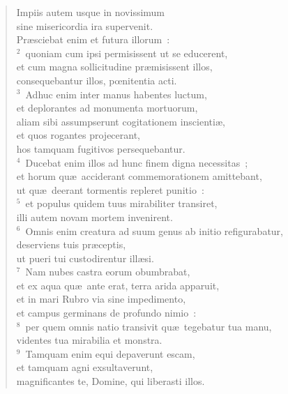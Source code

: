 \begin{flushleft}\begin{verse}\vspace{-19pt}\hspace{6pt}Impiis autem usque in novissimum\\\hspace{6pt} sine misericordia ira supervenit.\\ Pr\ae sciebat enim et futura illorum~:\\
${}^{2}$~quoniam cum ipsi permisissent ut se educerent,\\ et cum magna sollicitudine pr\ae misissent illos,\\ consequebantur illos, pœnitentia acti.\\
${}^{3}$~Adhuc enim inter manus habentes luctum,\\ et deplorantes ad monumenta mortuorum,\\ aliam sibi assumpserunt cogitationem inscienti\ae ,\\ et quos rogantes projecerant,\\ hos tamquam fugitivos persequebantur.\\
${}^{4}$~Ducebat enim illos ad hunc finem digna necessitas~;\\ et horum qu\ae\ acciderant commemorationem amittebant,\\ ut qu\ae\ deerant tormentis repleret punitio~:\\
${}^{5}$~et populus quidem tuus mirabiliter transiret,\\ illi autem novam mortem invenirent.\\
${}^{6}$~Omnis enim creatura ad suum genus ab initio refigurabatur,\\ deserviens tuis pr\ae ceptis,\\ ut pueri tui custodirentur ill\ae si.\\
${}^{7}$~Nam nubes castra eorum obumbrabat,\\ et ex aqua qu\ae\ ante erat, terra arida apparuit,\\ et in mari Rubro via sine impedimento,\\ et campus germinans de profundo nimio~:\\
${}^{8}$~per quem omnis natio transivit qu\ae\ tegebatur tua manu,\\ videntes tua mirabilia et monstra.\\
${}^{9}$~Tamquam enim equi depaverunt escam,\\ et tamquam agni exsultaverunt,\\ magnificantes te, Domine, qui liberasti illos.\\

\end{verse}
\end{flushleft}
